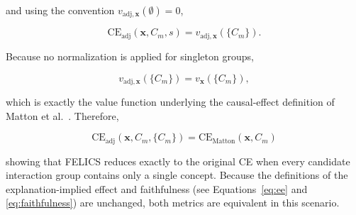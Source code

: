\begin{math_box}[label=ma:one_item_group]
    and using the convention $v_{\mathrm{adj},\mathbf{x}}(\emptyset)=0$,

    \begin{equation}
        \mathrm{CE}_{\mathrm{adj}}(\mathbf{x},C_m,s)
        =
        v_{\mathrm{adj},\mathbf{x}}(\{C_m\}).
    \end{equation}

    Because no normalization is applied for singleton groups,

    \begin{equation}
        v_{\mathrm{adj},\mathbf{x}}(\{C_m\})
        =
        v_{\mathbf{x}}(\{C_m\}),
    \end{equation}

    which is exactly the value function underlying the causal-effect definition of Matton et al.~\cite{mattonWalkTalkMeasuring2024}. Therefore,

    \begin{equation}
        \mathrm{CE}_{\mathrm{adj}}(\mathbf{x},C_m,\{C_m\})
        =
        \mathrm{CE}_{\mathrm{Matton}}(\mathbf{x},C_m)
    \end{equation}

    showing that FELICS reduces exactly to the original CE when every candidate interaction group contains only a single concept. Because the definitions of the explanation-implied effect and faithfulness (see Equations~\ref{eq:ee} and \ref{eq:faithfulness}) are unchanged, both metrics are equivalent in this scenario.
\end{math_box}


